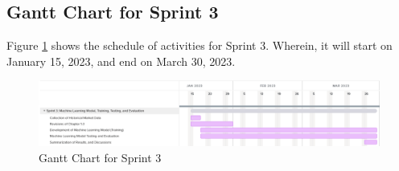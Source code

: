 \subsection{Gantt Chart for Sprint 3}
\label{subsec:gantt_chart_sprint3}
Figure \ref{fig:gantt_chart_sprint3} shows the schedule of activities for Sprint 3. 
Wherein, it will start on January 15, 2023, and end on March 30, 2023.
\begin{figure}[ht]
    \centering
    \includegraphics[width=1\textwidth]{./assets/Chapter_3/Gantt/Gantt_Chart_Sprint3.png}
    \caption{Gantt Chart for Sprint 3}
    \label{fig:gantt_chart_sprint3}
\end{figure}
\FloatBarrier